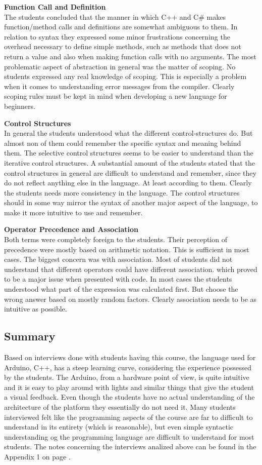 \textbf{Function Call and Definition}\\
The students concluded that the manner in which C++ and C{\#} makes function/method calls and definitions are somewhat ambiguous to them. In relation to syntax they expressed some minor frustrations concerning the overhead necessary to define simple methods, such as methods that does not return a value and also when making function calls with no arguments. The most problematic aspect of abstraction in general was the matter of scoping. No students expressed any real knowledge of scoping. This is especially a problem when it comes to understanding error messages from the compiler. Clearly scoping rules must be kept in mind when developing a new language for beginners.

\textbf{Control Structures}\\
In general the students understood what the different control-structures do. But almost non of them could remember the specific syntax and meaning behind them. The selective control structures seems to be easier to understand than the iterative control structures. A substantial amount of the students stated that the control structures in general are difficult to understand and remember, since they do not reflect anything else in the language. At least according to them.
Clearly the students needs more consistency in the language. The control structures should in some way mirror the syntax of another major aspect of the language, to make it more intuitive to use and remember.

\textbf{Operator Precedence and Association}\\
Both terms were completely foreign to the students. Their perception of precedence were mostly based on arithmetic notation. This is sufficient in most cases. The biggest concern was with association. Most of students did not understand that different operators could have different association. which proved to be a major issue when presented with code. In most cases the students understood what part of the expression was calculated first. But choose the wrong answer based on mostly random factors. Clearly association needs to be as intuitive as possible.

\subsection{Summary}
Based on interviews done with students having this course, the language used for Arduino, C++, has a steep learning curve, considering the experience possessed by the students. The Arduino, from a hardware point of view, is quite intuitive and it is easy to play around with lights and similar things that give the student a visual feedback. Even though the students have no actual understanding of the architecture of the platform they essentially do not need it. Many students interviewed felt like the programming aspects of the course are far to difficult to understand in its entirety (which is reasonable), but even simple syntactic understanding og the programming language are difficult to understand for most students. The notes concerning the interviews analized above can be found in the Appendix 1 on page \pageref{Interviews}.


